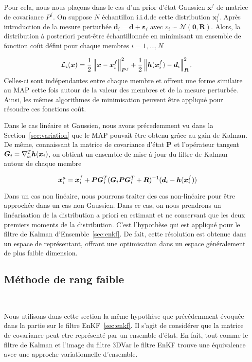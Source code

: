 Pour cela, nous nous plaçons dans le cas d'un prior d'état Gaussien $\bm x^f$ de matrice de covariance $P^f$. On suppose $N$ échantillon i.i.d.de cette distribution $\bm x^f_i$. Après introduction de la mesure perturbée $\bm d_i = \bm d + \bm \varepsilon_i$ avec $\varepsilon_i \sim \mathcal{N}(\bm 0, \bm R)$. Alors, la distribution à posteriori peut-être échantillonnée en minimisant un ensemble de fonction coût défini pour chaque membres $i = 1, \dots, N$

\begin{equation*}
    \mathcal L_i(\bm x) = \frac12 \left\lVert \bm x -\bm x^f_i \right\rVert^2_{\bm P^f} + \frac12 \left\lVert \bm h(\bm x^f_i) - \bm d_i \right\rVert_{\bm R}^2,
\end{equation*}Celles-ci sont indépendantes entre chaque membre et offrent une forme similaire au MAP cette fois autour de la valeur des membres et de la mesure perturbée. Ainsi, les mêmes algorithmes de minimisation peuvent être appliqué pour résoudre ces fonctions coût.

Dans le cas linéaire et Gaussien, nous avons précedemment vu dans la Section~\ref{sec:variation} que le MAP pouvait être obtenu grâce au gain de Kalman. De même, connaissant la matrice de covariance d'état $\bm P$ et l'opérateur tangent $\bm G_i = \nabla^T_{\bm{x}} \bm h(\bm{x}_i)$, on obtient un ensemble de mise à jour du filtre de Kalman autour de chaque membre

\begin{equation}~\label{eq:rml-kalman}
    \bm x ^a_i = \bm x^f_i + \bm P \bm G_i^T (\bm G_i \bm{P} \bm G_i^T + \bm{R})^{-1} (\bm{d}_i - \bm h(\bm{x}_i^f))
\end{equation}

Dans un cas non linéaire, nous pourrons traiter des cas non-linéaire pour être approchée dans un cas non Gaussien. Dans ce cas, on nous prendrons un linéarisation de la distribution a priori en estimant et ne conservant que les deux premiers moments de la distribution. C'est l'hypothèse qui est appliqué pour le filtre de Kalman d'Ensemble~\ref{sec:enkf}. De fait, cette résolution est obtenue dans un espace de représentant, offrant une optimisation dans un espace généralement de plus faible dimension.

\subsection{Méthode de rang faible}~\label{sec:faible_rang}

Nous utilisons dans cette section la même hypothèse que précédemment évoquée dans la partie sur le filtre EnKF~\ref{sec:enkf}. Il s'agit de considérer que la matrice de covariance peut etre représenté par un ensemble d'état. En fait, tout comme le filtre de Kalman et l'image du filtre 3DVar le filtre EnKF trouve une équivalence avec une approche variationnelle d'ensemble.

